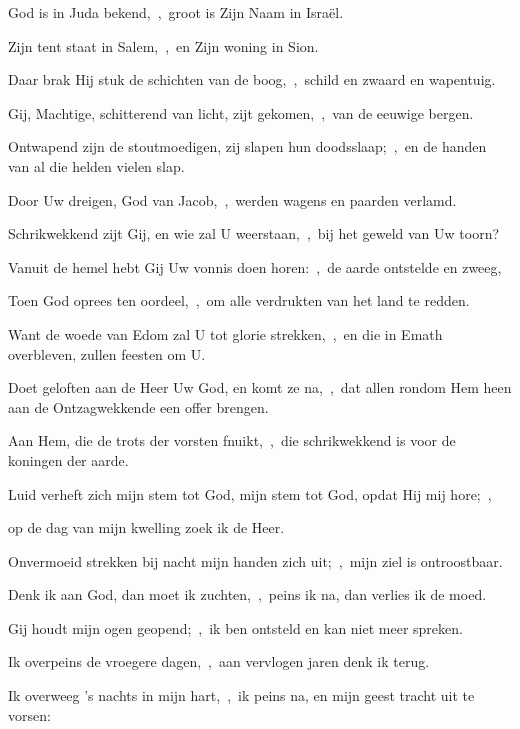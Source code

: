 \documentclass[12pt,twoside,a5paper]{article}
\begin{document}


\begin{halfparskip}
  God is in Juda bekend,~\sep\ groot is Zijn Naam in Israël.


  Zijn tent staat in Salem,~\sep\ en Zijn woning in Sion.

  Daar brak Hij stuk de schichten van de boog,~\sep\ schild en zwaard en wapentuig.

  Gij, Machtige, schitterend van licht, zijt gekomen,~\sep\ van de eeuwige bergen.

  Ontwapend zijn de stoutmoedigen, zij slapen hun doodsslaap;~\sep\ en de handen van al die helden vielen slap.

  Door Uw dreigen, God van Jacob,~\sep\ werden wagens en paarden verlamd.
\end{halfparskip}


\begin{halfparskip}
  Schrikwekkend zijt Gij, en wie zal U weerstaan,~\sep\ bij het geweld van Uw toorn?

  Vanuit de hemel hebt Gij Uw vonnis doen horen:~\sep\ de aarde ontstelde en zweeg,

  Toen God oprees ten oordeel,~\sep\ om alle verdrukten van het land te redden.

  Want de woede van Edom zal U tot glorie strekken,~\sep\ en die in Emath overbleven, zullen feesten om U.

  Doet geloften aan de Heer Uw God, en komt ze na,~\sep\ dat allen rondom Hem heen aan de Ontzagwekkende een offer brengen.

  Aan Hem, die de trots der vorsten fnuikt,~\sep\ die schrikwekkend is voor de koningen der aarde.
\end{halfparskip}



\begin{halfparskip}
  Luid verheft zich mijn stem tot God, mijn stem tot God, opdat Hij mij hore;~\sep


  op de dag van mijn kwelling zoek ik de Heer.

  Onvermoeid strekken bij nacht mijn handen zich uit;~\sep\ mijn ziel is ontroostbaar.

  Denk ik aan God, dan moet ik zuchten,~\sep\ peins ik na, dan verlies ik de moed.

  Gij houdt mijn ogen geopend;~\sep\ ik ben ontsteld en kan niet meer spreken.

  Ik overpeins de vroegere dagen,~\sep\ aan vervlogen jaren denk ik terug.

  Ik overweeg 's nachts in mijn hart,~\sep\ ik peins na, en mijn geest tracht uit te vorsen:
\end{halfparskip}
\end{document}
